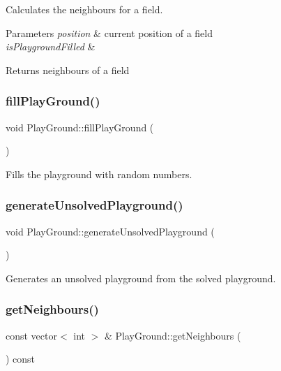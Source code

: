 Calculates the neighbours for a field. 
\begin{DoxyParams}{Parameters}
{\em position} & current position of a field \\
\hline
{\em is\+Playground\+Filled} & \\
\hline
\end{DoxyParams}
\begin{DoxyReturn}{Returns}
neighbours of a field 
\end{DoxyReturn}
\mbox{\label{class_play_ground_aea7c340233c4bf09b5fdc780090aea3e}} 
\subsubsection{\texorpdfstring{fill\+Play\+Ground()}{fillPlayGround()}}
{\footnotesize\ttfamily void Play\+Ground\+::fill\+Play\+Ground (\begin{DoxyParamCaption}{ }\end{DoxyParamCaption})}

Fills the playground with random numbers. \mbox{\label{class_play_ground_a80ec139301e7dfcb94030b9ee518349c}} 
\subsubsection{\texorpdfstring{generate\+Unsolved\+Playground()}{generateUnsolvedPlayground()}}
{\footnotesize\ttfamily void Play\+Ground\+::generate\+Unsolved\+Playground (\begin{DoxyParamCaption}{ }\end{DoxyParamCaption})}

Generates an unsolved playground from the solved playground. \mbox{\label{class_play_ground_a89330b39ecc7db7b8620c2c4914ff0f2}} 
\subsubsection{\texorpdfstring{get\+Neighbours()}{getNeighbours()}}
{\footnotesize\ttfamily const vector$<$ int $>$ \& Play\+Ground\+::get\+Neighbours (\begin{DoxyParamCaption}{ }\end{DoxyParamCaption}) const}

